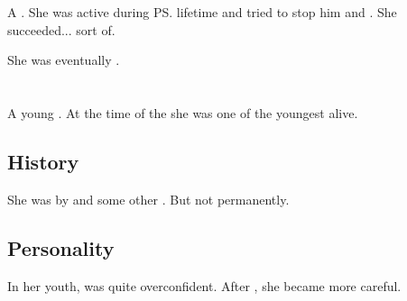 \section{\Vexstrasshin}
\index{\Vexstrasshin}
A \dragon{}. 
She was active during \ps{\Semiza} lifetime and tried to stop him and \Thanatzil. 
She succeeded... sort of. 

She was eventually . 















\section{\Zessuruch}
\index{\Zessuruch}
A young \dragon. 
At the time of the \thirdbanewar{} she was one of the youngest \dragons alive. 









\subsection{History}
She was  by  and some other \resphain. 
But not permanently. 









\subsection{Personality}
In her youth, \Zessuruch was quite overconfident. 
After , she became more careful. 























